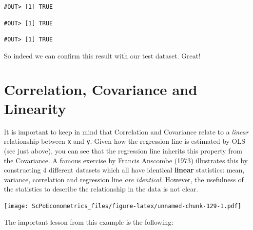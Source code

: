 \documentclass[]{book}
\newenvironment{Shaded}{\begin{snugshade}}{\end{snugshade}}
\newcommand{\KeywordTok}[1]{\textcolor[rgb]{0.13,0.29,0.53}{\textbf{#1}}}
\newcommand{\DecValTok}[1]{\textcolor[rgb]{0.00,0.00,0.81}{#1}}
\newcommand{\CommentTok}[1]{\textcolor[rgb]{0.56,0.35,0.01}{\textit{#1}}}
\newcommand{\OperatorTok}[1]{\textcolor[rgb]{0.81,0.36,0.00}{\textbf{#1}}}
\newcommand{\NormalTok}[1]{#1}
\theoremstyle{definition}
\theoremstyle{definition}
\theoremstyle{definition}
\theoremstyle{remark}
\begin{document}
\begin{verbatim}
#OUT> [1] TRUE
\end{verbatim}

\begin{Shaded}
\end{Shaded}

\begin{verbatim}
#OUT> [1] TRUE
\end{verbatim}

\begin{Shaded}
\end{Shaded}

\begin{verbatim}
#OUT> [1] TRUE
\end{verbatim}

So indeed we can confirm this result with our test dataset. Great!

\section{Correlation, Covariance and
Linearity}\label{correlation-covariance-and-linearity}

It is important to keep in mind that Correlation and Covariance relate
to a \emph{linear} relationship between \texttt{x} and \texttt{y}. Given
how the regression line is estimated by OLS (see just above), you can
see that the regression line inherits this property from the Covariance.
A famous exercise by Francis Anscombe (1973) illustrates this by
constructing 4 different datasets which all have identical
\textbf{linear} statistics: mean, variance, correlation and regression
line \emph{are identical}. However, the usefulness of the statistics to
describe the relationship in the data is not clear.

\texttt{[image: ScPoEconometrics\_files/figure-latex/unnamed-chunk-129-1.pdf]}

The important lesson from this example is the following:
\end{document}

